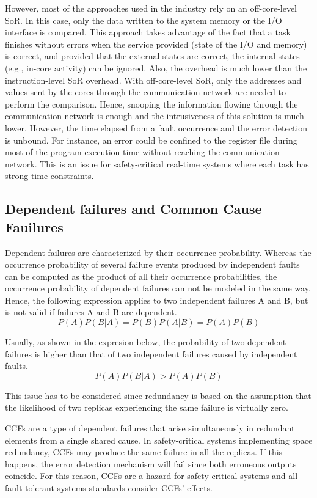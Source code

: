 However, most of the approaches used in the industry rely on an off-core-level SoR. In this case, only the data written to the system memory or the I/O interface is compared. This approach takes advantage of the fact that a task finishes without errors when the service provided (state of the I/O and memory) is correct, and provided that the external states are correct, the internal states (e.g., in-core activity) can be ignored. Also, the overhead is much lower than the instruction-level SoR overhead. With off-core-level SoR, only the addresses and values sent by the cores through the communication-network are needed to perform the comparison. Hence, snooping the information flowing through the communication-network is enough and the intrusiveness of this solution is much lower. However, the time elapsed from a fault occurrence and the error detection is unbound. For instance, an error could be confined to the register file during most of the program execution time without reaching the communication-network. This is an issue for safety-critical real-time systems where each task has strong time constraints.

\bigskip





\subsection{Dependent failures and Common Cause Fauilures}
\label{section:CCFs}

Dependent failures \cite{Tummeltshammer2009} are characterized by their occurrence probability. Whereas the occurrence probability of several failure events produced by independent faults can be computed as the product of all their occurrence probabilities, the occurrence probability of dependent failures can not be modeled in the same way. Hence, the following expression applies to two independent failures A and B, but is not valid if failures A and B are dependent. \[P(A) P(B|A) = P(B) P(A|B) = P(A) P(B)\]

Usually, as shown in the expresion below, the probability of two dependent failures is higher than that of two independent failures caused by independent faults. \[P(A) P(B|A) > P(A) P(B)\]

This issue has to be considered since redundancy is based on the assumption that the likelihood of two replicas experiencing the same failure is virtually zero.

CCFs are a type of dependent failures that arise simultaneously in redundant elements from a single shared cause. In safety-critical systems implementing space redundancy, CCFs may produce the same failure in all the replicas. If this happens, the error detection mechanism will fail since both erroneous outputs coincide. For this reason, CCFs are a hazard for safety-critical systems and all fault-tolerant systems standards consider CCFs' effects.

